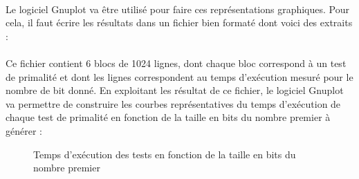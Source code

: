			\paragraph{} Le logiciel {\ttfamily Gnuplot} va être utilisé pour faire ces représentations graphiques. Pour cela, il faut écrire les résultats dans un fichier bien formaté dont voici des extraits :
			
			
			
			\paragraph{}Ce fichier contient 6 blocs de 1024 lignes, dont chaque bloc correspond à un test de primalité et dont les lignes correspondent au temps d'exécution mesuré pour le nombre de bit donné. En exploitant les résultat de ce fichier, le logiciel {\ttfamily Gnuplot} va permettre de construire les courbes représentatives du temps d'exécution de chaque test de primalité en fonction de la taille en bits du nombre premier à générer :
			
			\begin{figure}[H]\vspace{-1em}\caption{Temps d'exécution des tests en fonction de la taille en bits du nombre premier}\label{fig:M4}\end{figure}
			
